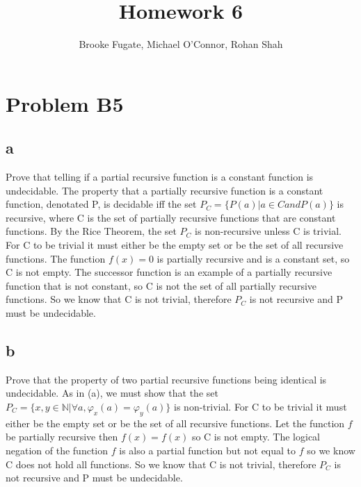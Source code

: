 \documentclass[12pt]{article}
\begin{document}
\pagestyle{plain}
\titleformat{\subsection}[runin]
  {\normalfont\large\bfseries}{\thesubsection}{1em}{}
\titleformat{\subsubsection}[runin]
  {\bfseries}{}{1em}{}

\title{Homework 6}
\author{Brooke Fugate, Michael O'Connor, Rohan Shah}
\date{}

\maketitle

\section*{Problem B5}
\subsection*{a}
Prove that telling if a partial recursive function is a constant function is undecidable.  The property that a partially recursive function is a constant function, denotated P, is decidable iff the set $P_C = \{P(a)|a \in C and P(a)\}$ is recursive, where C is the set of partially recursive functions that are constant functions. By the Rice Theorem, the set $P_C$ is non-recursive unless C is trivial.  For C to be trivial it must either be the empty set or be the set of all recursive functions. The function $f(x)=0$ is partially recursive and is a constant set, so C is not empty.  The successor function is an example of a partially recursive function that is not constant, so C is not the set of all partially recursive functions.  So we know that C is not trivial, therefore $P_C$ is not recursive and P must be undecidable. 
\subsection*{b} 
Prove that the property of two partial recursive functions being identical is undecidable.  As in (a), we must show that the set $P_C = \{x,y \in \mathbb{N} | \forall a, \varphi_x (a) = \varphi_y(a)\}$ is non-trivial.  For C to be trivial it must either be the empty set or be the set of all recursive functions. Let the function $f$ be partially recursive then $f(x) = f(x)$ so C is not empty.  The logical negation of the function $f$ is also a partial function but not equal to $f$ so we know C does not hold all functions.  So we know that C is not trivial, therefore $P_C$ is not recursive and P must be undecidable. 
\end{document}
